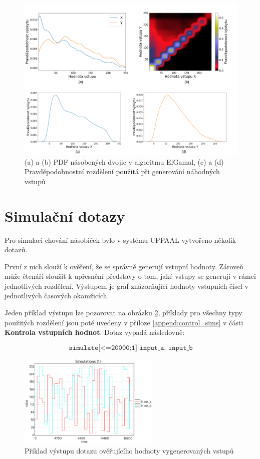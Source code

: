 \begin{figure}[H]
    \centering
    \includegraphics[width=\textwidth]{obrazky-figures/triang_weibull_all.png}
    \caption{(a) a (b) PDF násobených dvojic v algoritmu ElGamal, (c) a (d) Pravděpodobnostní rozdělení použitá při generování náhodných vstupů}
    \label{fig:triang_weibull}
\end{figure}

\section{Simulační dotazy} \label{sim_dotazy}
Pro simulaci chování násobiček bylo v systému UPPAAL vytvořeno několik dotazů.

První z nich slouží k ověření, že se správně generují vstupní hodnoty. Zároveň může čtenáři sloužit k upřesnění představy o tom, jaké vstupy se generují v rámci jednotlivých rozdělení. Výstupem je graf znázorňující hodnoty vstupních čísel v jednotlivých časových okamžicích. 

Jeden příklad výstupu lze pozorovat na obrázku \ref{fig:input_sim_example}, příklady pro všechny typy použitých rozdělení jsou poté uvedeny v příloze \ref{append:control_sims} v části \textbf{Kontrola vstupních hodnot}. Dotaz vypadá následovně:

\begin{equation*}
    \texttt{simulate[<=20000;1] {input\_a, input\_b}}
\end{equation*}

\begin{figure}[H]
    \centering
    \includegraphics[width=0.6\textwidth]{obrazky-figures/inputs_uni_uni.png}
    \caption{Příklad výstupu dotazu ověřujícího hodnoty vygenerovaných vstupů}
    \label{fig:input_sim_example}
\end{figure}

